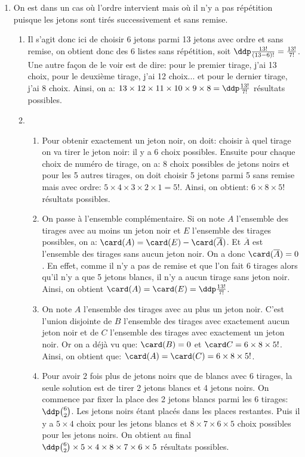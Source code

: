 \documentclass[a4paper, 11pt]{article}
\begin{document}
\begin{correction}
\begin{enumerate}
\begin{enumerate}
\begin{enumerate}
			            \end{enumerate}
		      \end{enumerate}
		\item On est dans un cas o\`u l'ordre intervient mais o\`u il n'y a pas r\'ep\'etition puisque les jetons sont tir\'es successivement et sans remise.
		      \begin{enumerate}
			      \item Il s'agit donc ici de choisir 6 jetons parmi 13 jetons avec ordre et sans remise, on obtient donc des $6$ listes sans r\'ep\'etition, soit $\ddp \frac{13!}{(13-6)!} = \frac{13!}{7!}$. Une autre fa\c{c}on de le voir est de dire: pour le premier tirage, j'ai 13 choix, pour le deuxi\`eme tirage, j'ai 12 choix... et pour le dernier tirage, j'ai 8 choix. Ainsi, on a: $13\times 12\times 11\times 10\times 9\times 8=\ddp\frac{13!}{7!}$ r\'esultats possibles.
			      \item
			            \begin{enumerate}
				            \item Pour obtenir exactement un jeton noir, on doit: choisir \`a quel tirage on va tirer le jeton noir: il y a 6 choix possibles. Ensuite pour chaque choix de num\'ero de tirage, on a: 8 choix possibles de jetons noirs et pour les 5 autres tirages, on doit choisir 5 jetons parmi 5 sans remise mais avec ordre: $5\times 4\times 3\times 2\times 1=5!$. Ainsi, on obtient: $6\times 8\times 5!$ r\'esultats possibles.
				            \item On passe \`a l'ensemble compl\'ementaire. Si on note $A$ l'ensemble des tirages avec au moins un jeton noir et $E$ l'ensemble des tirages possibles, on a: $\card (A)=\card (E)-\card (\overline{A})$. Et $\overline{A}$ est l'ensemble des tirages sans aucun jeton noir. On a donc $\card (\overline{A})=0$. En effet, comme il n'y a pas de remise et que l'on fait 6 tirages alors qu'il n'y a que 5 jetons blancs, il n'y a aucun tirage sans jeton noir. Ainsi, on obtient $\card (A)=\card (E)=\ddp\frac{13!}{7!}$.
				            \item On note $A$ l'ensemble des tirages avec au plus un jeton noir. C'est l'union disjointe de $B$ l'ensemble des tirages avec exactement aucun jeton noir et de $C$ l'ensemble des tirages avec exactement un jeton noir. Or on a d\'ej\`a vu que: $\card (B)=0$ et $\card C=6\times 8\times 5!$. Ainsi, on obtient que: $\card (A)=\card (C)= 6\times 8\times 5!$.
				            \item Pour avoir 2 fois plus de jetons noirs que de blancs avec 6 tirages, la seule solution est de tirer 2 jetons blancs et 4 jetons noirs. On commence par fixer la place des 2 jetons blancs parmi les 6 tirages: $\ddp \binom{6}{2}$. Les jetons noirs \'etant plac\'es dans les places restantes. Puis il y a $5\times 4$ choix pour les jetons blancs et $8\times 7\times 6\times 5$ choix possibles pour les jetons noirs. On obtient au final $\ddp \binom{6}{2}\times 5\times 4 \times 8\times 7\times 6\times 5$ r\'esultats possibles.

\end{enumerate}
\end{enumerate}
\end{enumerate}
\end{correction}
\end{document}
